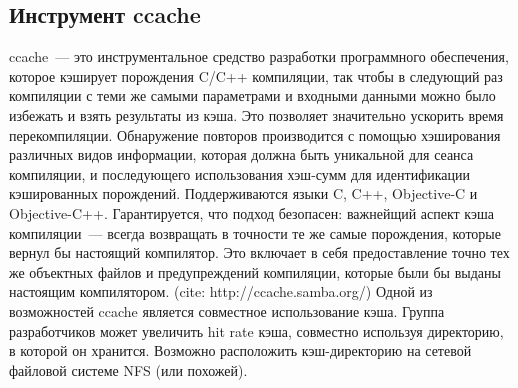 \subsection{Инструмент ccache}
ccache~--- это инструментальное средство разработки программного обеспечения, которое кэширует порождения C/C++ компиляции, так чтобы в следующий раз компиляции с теми же самыми параметрами и входными данными можно было избежать и взять результаты из кэша. Это позволяет значительно ускорить время перекомпиляции. Обнаружение повторов производится с помощью хэширования различных видов информации, которая должна быть уникальной для сеанса компиляции, и последующего использования хэш-сумм для идентификации кэшированных порождений. Поддерживаются языки C, C++, Objective-C и Objective-C++. Гарантируется, что подход безопасен: важнейщий аспект кэша компиляции~--- всегда возвращать в точности те же самые порождения, которые вернул бы настоящий компилятор. Это включает в себя предоставление точно тех же объектных файлов и предупреждений компиляции, которые были бы выданы настоящим компилятором. (cite: http://ccache.samba.org/)
Одной из возможностей ccache является совместное использование кэша. Группа разработчиков может увеличить hit rate кэша, совместно используя директорию, в которой он хранится. Возможно расположить кэш-директорию на сетевой файловой системе NFS (или похожей).